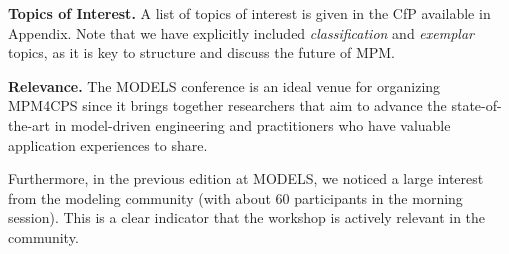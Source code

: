 \smallskip
\noindent
\textbf{Topics of Interest.}
%
A list of topics of interest is given in the CfP available in Appendix.
Note that we have explicitly included \emph{classification} and \emph{exemplar} 
topics, as it is key to structure and discuss the future of MPM. %



\noindent
\textbf{Relevance.}
%
The MODELS conference is an ideal venue for organizing MPM4CPS since it brings 
together researchers that aim to advance the state-of-the-art in model-driven 
engineering and practitioners who have valuable application experiences to share.

Furthermore, in the previous edition at MODELS, we noticed a large interest from the modeling community (with about 60 participants in the morning session). This is a clear indicator that the workshop is actively relevant in the community.




